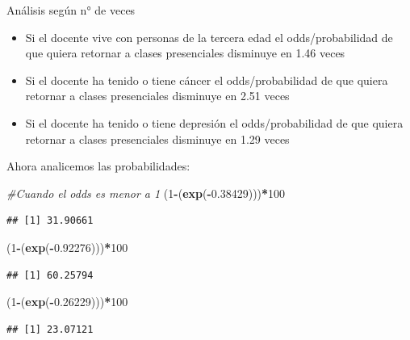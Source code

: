 \documentclass[
]{article}
\newenvironment{Shaded}{\begin{snugshade}}{\end{snugshade}}
\newcommand{\CommentTok}[1]{\textcolor[rgb]{0.56,0.35,0.01}{\textit{#1}}}
\newcommand{\DecValTok}[1]{\textcolor[rgb]{0.00,0.00,0.81}{#1}}
\newcommand{\FloatTok}[1]{\textcolor[rgb]{0.00,0.00,0.81}{#1}}
\newcommand{\FunctionTok}[1]{\textcolor[rgb]{0.13,0.29,0.53}{\textbf{#1}}}
\newcommand{\NormalTok}[1]{#1}
\newcommand{\SpecialCharTok}[1]{\textcolor[rgb]{0.81,0.36,0.00}{\textbf{#1}}}
\begin{document}
Análisis según n° de veces

\begin{itemize}
\item
  Si el docente vive con personas de la tercera edad el
  odds/probabilidad de que quiera retornar a clases presenciales
  disminuye en 1.46 veces
\item
  Si el docente ha tenido o tiene cáncer el odds/probabilidad de que
  quiera retornar a clases presenciales disminuye en 2.51 veces
\item
  Si el docente ha tenido o tiene depresión el odds/probabilidad de que
  quiera retornar a clases presenciales disminuye en 1.29 veces
\end{itemize}

Ahora analicemos las probabilidades:

\begin{Shaded}
\begin{Highlighting}[]
\CommentTok{\#Cuando el odds es menor a 1}
\NormalTok{(}\DecValTok{1}\SpecialCharTok{{-}}\NormalTok{(}\FunctionTok{exp}\NormalTok{(}\SpecialCharTok{{-}}\FloatTok{0.38429}\NormalTok{)))}\SpecialCharTok{*}\DecValTok{100}
\end{Highlighting}
\end{Shaded}

\begin{verbatim}
## [1] 31.90661
\end{verbatim}

\begin{Shaded}
\begin{Highlighting}[]
\NormalTok{(}\DecValTok{1}\SpecialCharTok{{-}}\NormalTok{(}\FunctionTok{exp}\NormalTok{(}\SpecialCharTok{{-}}\FloatTok{0.92276}\NormalTok{)))}\SpecialCharTok{*}\DecValTok{100} 
\end{Highlighting}
\end{Shaded}

\begin{verbatim}
## [1] 60.25794
\end{verbatim}

\begin{Shaded}
\begin{Highlighting}[]
\NormalTok{(}\DecValTok{1}\SpecialCharTok{{-}}\NormalTok{(}\FunctionTok{exp}\NormalTok{(}\SpecialCharTok{{-}}\FloatTok{0.26229}\NormalTok{)))}\SpecialCharTok{*}\DecValTok{100} 
\end{Highlighting}
\end{Shaded}

\begin{verbatim}
## [1] 23.07121
\end{verbatim}
\end{document}
